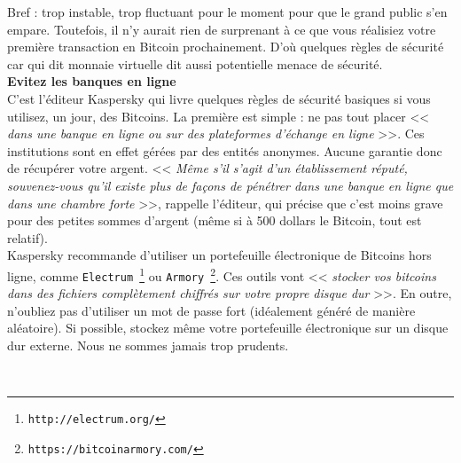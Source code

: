 \documentclass[11pt,twoside,a4paper]{article}
\begin{document}
Bref : trop instable, trop fluctuant pour le moment pour que le grand public s'en empare. Toutefois, il n'y aurait rien de surprenant {\`a} ce que vous r{\'e}alisiez votre premi{\`e}re transaction en Bitcoin prochainement. D'o{\`u} quelques r{\`e}gles de s{\'e}curit{\'e} car qui dit monnaie virtuelle dit aussi potentielle menace de s{\'e}curit{\'e}.  ~\\

\textbf{Evitez les banques en ligne} ~\\

C'est l'{\'e}diteur Kaspersky qui livre quelques r{\`e}gles de s{\'e}curit{\'e} basiques si vous utilisez, un jour, des Bitcoins. La premi{\`e}re est simple : ne pas tout placer << \emph{dans une banque en ligne ou sur des plateformes d'{\'e}change en ligne} >>. Ces institutions sont en effet g{\'e}r{\'e}es par des entit{\'e}s anonymes. Aucune garantie donc de r{\'e}cup{\'e}rer votre argent. << \emph{M{\^e}me s'il s'agit d'un {\'e}tablissement r{\'e}put{\'e}, souvenez-vous qu'il existe plus de fa\c{c}ons de p{\'e}n{\'e}trer dans une banque en ligne que dans une chambre forte} >>, rappelle l'{\'e}diteur, qui pr{\'e}cise que c'est moins grave pour des petites sommes d'argent (m{\^e}me si {\`a} 500 dollars le Bitcoin, tout est relatif). ~\\ 

Kaspersky recommande d'utiliser un portefeuille {\'e}lectronique de Bitcoins hors ligne, comme \texttt{Electrum~\footnote{\texttt{http://electrum.org/}}} ou \texttt{Armory~\footnote{\texttt{https://bitcoinarmory.com/}}}. Ces outils vont << \emph{stocker vos bitcoins dans des fichiers compl{\`e}tement chiffr{\'e}s sur votre propre disque dur} >>. En outre, n'oubliez pas d'utiliser un mot de passe fort (id{\'e}alement g{\'e}n{\'e}r{\'e} de mani{\`e}re al{\'e}atoire). Si possible, stockez m{\^e}me votre portefeuille {\'e}lectronique sur un disque dur externe. Nous ne sommes jamais trop prudents.  ~\\

\clearpage

~\\

\clearpage
\end{document}
